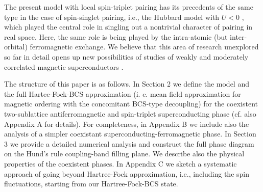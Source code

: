 \documentclass[aps,prb,showpacs,reprint]{revtex4-1}
\begin{document}
The
present model with local spin-triplet pairing has its precedents of the same
type in the case of spin-singlet pairing, i.e., the Hubbard model with $U<0$
\cite{Micnas}, which played the central role in
singling out a nontrivial character of pairing in real space. Here, the same
role is being
played by the intra-atomic (but inter-orbital) ferromagnetic exchange. We
believe that this area of research unexplored so far in detail opens up new possibilities of studies of
weakly and moderately correlated magnetic superconductors \cite{Nomura2002}. 

The structure of this paper is as follows. In Section 2 we define the model and
the full Hartee-Fock-BCS approximation (i. e. mean field approximation for
magnetic
ordering with the concomitant BCS-type decoupling) for the coexistent
two-sublattice antiferromagnetic and spin-triplet superconducting phase (cf. also Appendix A for details). For completeness, in Appendix B we include also the analysis of a simpler coexistant superconducting-ferromagnetic phase. In
Section 3 we provide a detailed numerical analysis and construct the full phase
diagram on the Hund's rule coupling-band filling plane. We describe also the physical properties of the coexistent phases. In Appendix C we sketch a systematic approach of
going beyond Hartree-Fock approximation, i.e., including the spin fluctuations, starting from our Hartree-Fock-BCS state.
\end{document}
